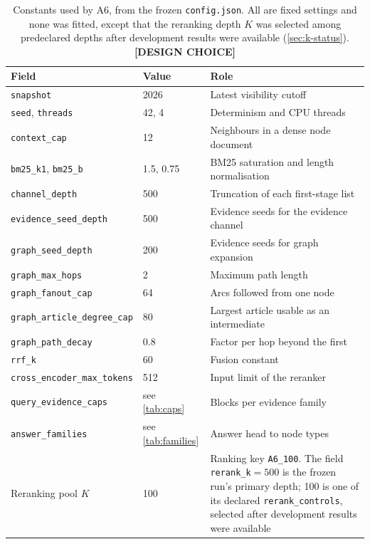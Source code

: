 \documentclass[11pt,a4paper]{article}
\newcommand{\cref}[1]{\autoref{#1}}
\theoremstyle{remark}
\newcommand{\code}[1]{\texttt{\small #1}}
\newcommand{\vtag}[2]{{\sffamily\scriptsize\bfseries\textcolor{#1}{[#2]}}}
\newcommand{\Dtag}{\vtag{black!60}{DESIGN CHOICE}}
\begin{document}
\begin{table}[H]
\centering
\caption[Configuration constants]{Constants used by A6, from the frozen \code{config.json}. All are fixed
settings and none was fitted, except that the reranking depth $K$ was selected among
predeclared depths after development results were available (\cref{sec:k-status}). \Dtag}
\label{tab:config}
\small
\begin{tabularx}{\linewidth}{p{5.0cm}p{3.2cm}X}
\toprule
Field & Value & Role\\
\midrule
\code{snapshot} & 2026 & Latest visibility cutoff\\
\code{seed}, \code{threads} & 42, 4 & Determinism and CPU threads\\
\code{context\_cap} & 12 & Neighbours in a dense node document\\
\code{bm25\_k1}, \code{bm25\_b} & 1.5, 0.75 & BM25 saturation and length normalisation\\
\code{channel\_depth} & 500 & Truncation of each first-stage list\\
\code{evidence\_seed\_depth} & 500 & Evidence seeds for the evidence channel\\
\code{graph\_seed\_depth} & 200 & Evidence seeds for graph expansion\\
\code{graph\_max\_hops} & 2 & Maximum path length\\
\code{graph\_fanout\_cap} & 64 & Arcs followed from one node\\
\code{graph\_article\_degree\_cap} & 80 & Largest article usable as an intermediate\\
\code{graph\_path\_decay} & 0.8 & Factor per hop beyond the first\\
\code{rrf\_k} & 60 & Fusion constant\\
\code{cross\_encoder\_max\_tokens} & 512 & Input limit of the reranker\\
\code{query\_evidence\_caps} & see \cref{tab:caps} & Blocks per evidence family\\
\code{answer\_families} & see \cref{tab:families} & Answer head to node types\\
Reranking pool $K$ & 100 & Ranking key \code{A6\_100}. The field \code{rerank\_k}${}=500$ is the
  frozen run's primary depth; 100 is one of its declared \code{rerank\_controls}, selected
  after development results were available\\
\bottomrule
\end{tabularx}
\end{table}
\end{document}
